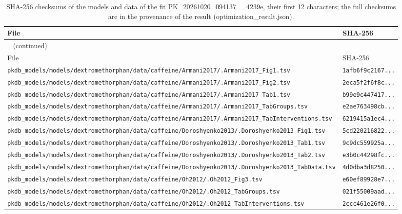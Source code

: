 \begin{longtable}{ll}
\caption{SHA-256 checksums of the models and data of the fit PK\_20261020\_094137\_\_4239e, their first 12 characters; the full checksums are in the provenance of the result (optimization\_result.json).}\label{tab:checksums:PK_20261020_094137__4239e} \\
\toprule
File & SHA-256 \\
\midrule
\endfirsthead
\multicolumn{2}{l}{\small\tablename~\thetable{} (continued)} \\
\toprule
File & SHA-256 \\
\midrule
\endhead
\bottomrule
\endlastfoot
\texttt{pkdb\_models/models/dextromethorphan/data/caffeine/Armani2017/.Armani2017\_Fig1.tsv} & \texttt{1afb6f9c2167...} \\
\texttt{pkdb\_models/models/dextromethorphan/data/caffeine/Armani2017/.Armani2017\_Fig2.tsv} & \texttt{2eca5f2f6f8c...} \\
\texttt{pkdb\_models/models/dextromethorphan/data/caffeine/Armani2017/.Armani2017\_Tab1.tsv} & \texttt{b99e9c447417...} \\
\texttt{pkdb\_models/models/dextromethorphan/data/caffeine/Armani2017/.Armani2017\_TabGroups.tsv} & \texttt{e2ae763498cb...} \\
\texttt{pkdb\_models/models/dextromethorphan/data/caffeine/Armani2017/.Armani2017\_TabInterventions.tsv} & \texttt{6219415a1ec4...} \\
\texttt{pkdb\_models/models/dextromethorphan/data/caffeine/Doroshyenko2013/.Doroshyenko2013\_Fig1.tsv} & \texttt{5cd220216822...} \\
\texttt{pkdb\_models/models/dextromethorphan/data/caffeine/Doroshyenko2013/.Doroshyenko2013\_Tab1.tsv} & \texttt{9c9dc559925a...} \\
\texttt{pkdb\_models/models/dextromethorphan/data/caffeine/Doroshyenko2013/.Doroshyenko2013\_Tab2.tsv} & \texttt{e3b0c44298fc...} \\
\texttt{pkdb\_models/models/dextromethorphan/data/caffeine/Doroshyenko2013/.Doroshyenko2013\_TabData.tsv} & \texttt{4d0dba3d8250...} \\
\texttt{pkdb\_models/models/dextromethorphan/data/caffeine/Oh2012/.Oh2012\_Fig3.tsv} & \texttt{e60ef89928e7...} \\
\texttt{pkdb\_models/models/dextromethorphan/data/caffeine/Oh2012/.Oh2012\_TabGroups.tsv} & \texttt{021f55009aad...} \\
\texttt{pkdb\_models/models/dextromethorphan/data/caffeine/Oh2012/.Oh2012\_TabInterventions.tsv} & \texttt{2ccc461e26f0...} \\

\end{longtable}
